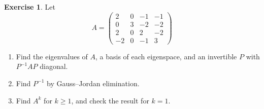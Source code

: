 \documentclass[12pt]{article}
\theoremstyle{definition}
\newtheorem{exercise}{Exercise}
\begin{document}
\begin{exercise}\label{r7-ex-diag-drill}
Let
\[
A=\begin{pmatrix}2&0&-1&-1\\0&3&-2&-2\\2&0&2&-2\\-2&0&-1&3\end{pmatrix}
\]
\begin{enumerate}
\item Find the eigenvalues of \(A\), a basis of each eigenspace, and an invertible \(P\) with \(P^{-1}AP\) diagonal.
\item Find \(P^{-1}\) by Gauss--Jordan elimination.
\item Find \(A^k\) for \(k\geqslant1\), and check the result for \(k=1\).
\end{enumerate}
\end{exercise}
\end{document}
